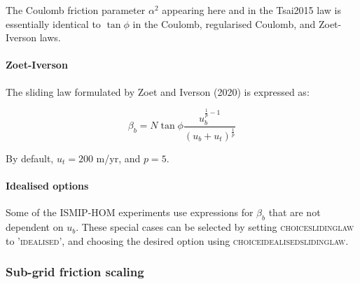 \documentclass{article}
\begin{document}
The Coulomb friction parameter $\alpha^2$ appearing here and in the Tsai2015 law is essentially identical to $\tan \phi$ in the Coulomb, regularised Coulomb, and Zoet-Iverson laws.

\paragraph{Zoet-Iverson}
The sliding law formulated by Zoet and Iverson (2020) is expressed as:

\begin{equation} \label{eq:slid_ZoetIverson}
\beta_b = N \tan \phi \frac{ u_b^{ \frac{1}{p}-1} } { {\left( u_b + u_t \right) }^{\frac{1}{p}} }
\end{equation}

By default, $u_t = 200$ m/yr, and $p = 5$.

\paragraph{Idealised options}
Some of the ISMIP-HOM experiments use expressions for $\beta_b$ that are not dependent on $u_b$. These special cases can be selected by setting \textsc{choice\textunderscore sliding\textunderscore law} to \textsc{'idealised'}, and choosing the desired option using \textsc{choice\textunderscore idealised\textunderscore sliding\textunderscore law}.

\subsubsection{Sub-grid friction scaling}
\end{document}
